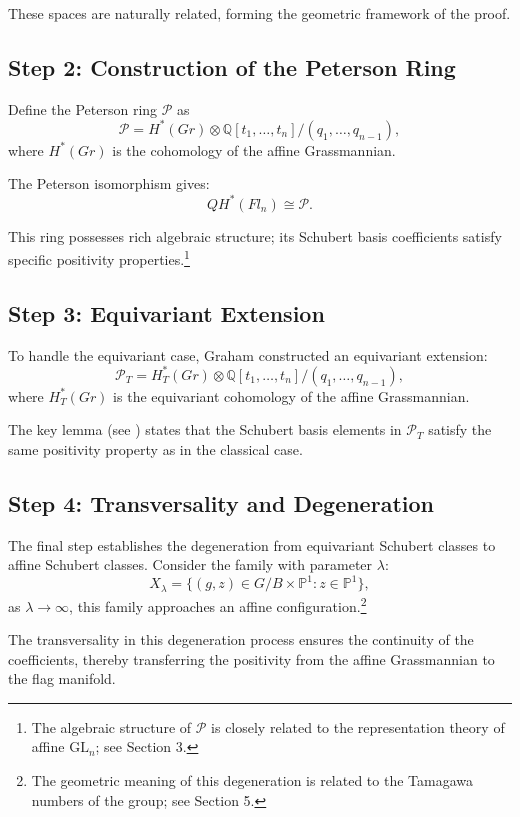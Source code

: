 These spaces are naturally related, forming the geometric framework of the proof.

\subsection{Step 2: Construction of the Peterson Ring}

Define the Peterson ring $\mathcal{P}$ as
$$\mathcal{P} = H^*(Gr) \otimes \mathbb{Q}[t_1, \ldots, t_n] / (q_1, \ldots, q_{n-1}),$$
where $H^*(Gr)$ is the cohomology of the affine Grassmannian.

The Peterson isomorphism gives:
$$QH^*(Fl_n) \cong \mathcal{P}.$$

This ring possesses rich algebraic structure; its Schubert basis coefficients satisfy specific positivity properties.\footnote{The algebraic structure of $\mathcal{P}$ is closely related to the representation theory of affine $\mathrm{GL}_n$; see \cite{Gr} Section 3.}

\subsection{Step 3: Equivariant Extension}

To handle the equivariant case, Graham constructed an equivariant extension:
$$\mathcal{P}_T = H_T^*(Gr) \otimes \mathbb{Q}[t_1, \ldots, t_n] / (q_1, \ldots, q_{n-1}),$$
where $H_T^*(Gr)$ is the equivariant cohomology of the affine Grassmannian.

The key lemma (see \cite[Section 3]{Gr}) states that the Schubert basis elements in $\mathcal{P}_T$ satisfy the same positivity property as in the classical case.

\subsection{Step 4: Transversality and Degeneration}

The final step establishes the degeneration from equivariant Schubert classes to affine Schubert classes. Consider the family with parameter $\lambda$:
$$X_\lambda = \{ (g, z) \in G/B \times \mathbb{P}^1 : z \in \mathbb{P}^1 \},$$
as $\lambda \to \infty$, this family approaches an affine configuration.\footnote{The geometric meaning of this degeneration is related to the Tamagawa numbers of the group; see \cite{Gr} Section 5.}

The transversality in this degeneration process ensures the continuity of the coefficients, thereby transferring the positivity from the affine Grassmannian to the flag manifold.

